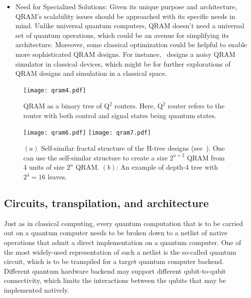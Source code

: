 \begin{itemize}
\item Need for Specialized Solutions: Given its unique purpose and architecture, QRAM's scalability issues should be approached with its specific needs in mind. Unlike universal quantum computers, QRAM doesn't need a universal set of quantum operations, which could be an avenue for simplifying its architecture. Moreover, some classical optimization could be helpful to enable more sophisticated QRAM designs. For instance,~\cite{hann2021resilience} designs a noisy QRAM simulator in classical devices, which might be for further explorations of QRAM designs and simulation in a classical space. 



\end{itemize}


\begin{figure}
    \centering
     \texttt{[image: qram4.pdf]}
     \caption{QRAM as a binary tree of $\text{Q}^2$ routers. Here, $\text{Q}^2$ router refers to the router with both control and signal states being quantum states.}
     \label{fig:challenges}
\end{figure}

\begin{figure}
    \centering
    \texttt{[image: qram6.pdf]}
     \texttt{[image: qram7.pdf]}
     \caption{$(a)$ Self-similar fractal structure of the H-tree designs (see~\cite{xu2023systems}). One can use the self-similar structure to create a size $2^{n+2}$ QRAM from 4 units of size $2^n$ QRAM. $(b)$: An example of depth-4 tree with $2^4=16$ leaves. }
     \label{fig:challenges2}
\end{figure}



\subsection{Circuits, transpilation, and architecture}

Just as in classical computing, every quantum computation that is to be carried out on a quantum computer needs to be broken down to a netlist of native operations that admit a direct implementation on a quantum computer. One of the most widely-used representation of such a netlist is the so-called quantum circuit, which is to be transpiled for a target quantum computer backend. Different quantum hardware backend may support different qubit-to-qubit connectivity, which limits the interactions between the qubits that may be implemented natively. 

